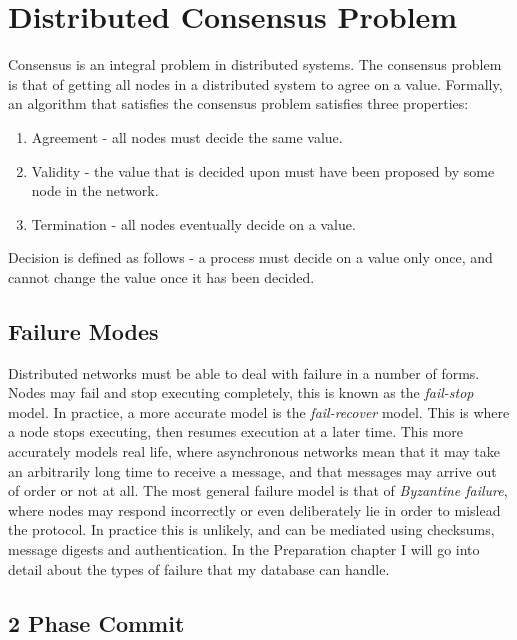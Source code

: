 \documentclass[12pt,twoside,notitlepage]{report}
\begin{document}
\section{Distributed Consensus Problem}

Consensus is an integral problem in distributed systems. The consensus problem is that of getting
all nodes in a distributed system to agree on a value. Formally, an algorithm that satisfies the
consensus problem satisfies three properties:

\begin{enumerate}
\item Agreement - all nodes must decide the same value.
\item Validity - the value that is decided upon must have been proposed by some node in the
	network.
\item Termination - all nodes eventually decide on a value.
\end{enumerate}

Decision is defined as follows - a process must decide on a value only once, and cannot change the
value once it has been decided.

\subsection*{Failure Modes}

Distributed networks must be able to deal with failure in a number of forms. Nodes may fail and
stop executing completely, this is known as the \emph{fail-stop} model. In practice, a more accurate
model is the \emph{fail-recover} model. This is where a node stops executing, then resumes execution
at a later time. This more accurately models real life, where asynchronous networks mean that it
may take an arbitrarily long time to receive a message, and that messages may arrive out of order
or not at all. The most general failure model is that of \emph{Byzantine failure}, where nodes may
respond incorrectly or even deliberately lie in order to mislead the protocol. In practice this is
unlikely, and can be mediated using checksums, message digests and authentication. In the
Preparation chapter I will go into detail about the types of failure that my database can handle.

\subsection*{2 Phase Commit}

\end{document}
